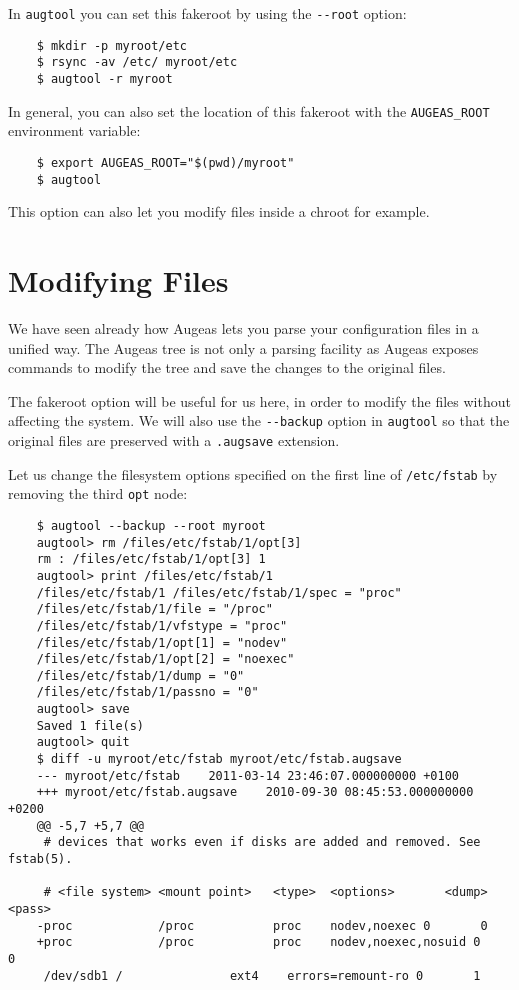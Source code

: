  

In \verb!augtool! you can set this fakeroot by using the \verb!--root! option:

\begin{verbatim}
    $ mkdir -p myroot/etc
    $ rsync -av /etc/ myroot/etc
    $ augtool -r myroot
\end{verbatim}

In general, you can also set the location of this fakeroot with the \verb!AUGEAS_ROOT! environment variable:

\begin{verbatim}
    $ export AUGEAS_ROOT="$(pwd)/myroot"
    $ augtool
\end{verbatim}

This option can also let you modify files inside a chroot for example.

\section{Modifying Files}

We have seen already how Augeas lets you parse your configuration files in a unified way. The Augeas tree is not only a parsing facility as Augeas exposes commands to modify the tree and save the changes to the original files.

The fakeroot option will be useful for us here, in order to modify the files without affecting the system. We will also use the \verb!--backup! option in \verb!augtool! so that the original files are preserved with a \verb!.augsave! extension.

     

Let us change the filesystem options specified on the first line of \verb!/etc/fstab! by removing the third \verb!opt! node:

\begin{verbatim}
    $ augtool --backup --root myroot
    augtool> rm /files/etc/fstab/1/opt[3]
    rm : /files/etc/fstab/1/opt[3] 1
    augtool> print /files/etc/fstab/1
    /files/etc/fstab/1 /files/etc/fstab/1/spec = "proc"
    /files/etc/fstab/1/file = "/proc"
    /files/etc/fstab/1/vfstype = "proc"
    /files/etc/fstab/1/opt[1] = "nodev"
    /files/etc/fstab/1/opt[2] = "noexec"
    /files/etc/fstab/1/dump = "0"
    /files/etc/fstab/1/passno = "0"
    augtool> save
    Saved 1 file(s)
    augtool> quit
    $ diff -u myroot/etc/fstab myroot/etc/fstab.augsave
    --- myroot/etc/fstab    2011-03-14 23:46:07.000000000 +0100
    +++ myroot/etc/fstab.augsave    2010-09-30 08:45:53.000000000 +0200
    @@ -5,7 +5,7 @@
     # devices that works even if disks are added and removed. See fstab(5).

     # <file system> <mount point>   <type>  <options>       <dump>  <pass>
    -proc            /proc           proc    nodev,noexec 0       0
    +proc            /proc           proc    nodev,noexec,nosuid 0       0
     /dev/sdb1 /               ext4    errors=remount-ro 0       1
\end{verbatim}


